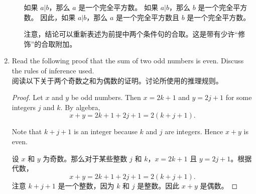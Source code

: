\begin{enumerate}
\begin{enumerate}
  如果 $a|b$，那么 $a$ 是一个完全平方数。\newline
  如果 $a|b$，那么 $b$ 是一个完全平方数。\newline
  因此，如果 $a|b$，那么 $a$ 是一个完全平方数且 $b$ 是一个完全平方数。
  
  注意，结论可以重新表述为前提中两个条件句的合取。这是带有少许“修饰”的合取附加。
  \wbvfill
  
  \end{enumerate}
  
  \workbookpagebreak
  
  \item Read the following proof that the sum of two odd numbers is even.
  Discuss the rules of inference used.\\
  
  阅读以下关于两个奇数之和为偶数的证明。讨论所使用的推理规则。\\
  \begin{proof}
  Let $x$ and $y$ be odd numbers.
  Then $x=2k+1$
  and $y=2j+1$ for some integers $j$ and $k$.  By algebra,
  \[
  x+y = 2k+1 + 2j+1 = 2(k+j+1).
  \]
  
  Note that $k+j+1$ is an integer because $k$ and $j$ are integers.
  Hence $x+y$ is even.
  
  设 $x$ 和 $y$ 为奇数。那么对于某些整数 $j$ 和 $k$，$x=2k+1$ 且 $y=2j+1$。根据代数，
  \[
  x+y = 2k+1 + 2j+1 = 2(k+j+1).
  \]
  注意 $k+j+1$ 是一个整数，因为 $k$ 和 $j$ 是整数。因此 $x+y$ 是偶数。
  \end{proof}
  
   
   \wbvfill
   
   \rule{0pt}{0pt}
   
   \wbvfill
   

\end{enumerate}
